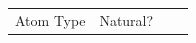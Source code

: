 \begin{table}[!htbp]

\fontsize{7pt}{7pt}
\selectfont

\begin{tabular}{c|lll}
Atom Type & Natural?\\

\end{tabular}
\end{table}

